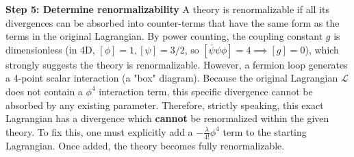 \begin{solution}
\textbf{Step 5: Determine renormalizability}
A theory is renormalizable if all its divergences can be absorbed into counter-terms that have the same form as the terms in the original Lagrangian.
By power counting, the coupling constant $g$ is dimensionless (in 4D, $[\phi]=1, [\psi]=3/2$, so $[\bar{\psi}\psi\phi] = 4 \implies [g]=0$), which strongly suggests the theory is renormalizable.
However, a fermion loop generates a 4-point scalar interaction (a "box" diagram).
Because the original Lagrangian $\mathcal{L}$ does not contain a $\phi^4$ interaction term, this specific divergence cannot be absorbed by any existing parameter. Therefore, strictly speaking, this exact Lagrangian has a divergence which \textbf{cannot} be renormalized within the given theory. To fix this, one must explicitly add a $-\frac{\lambda}{4!}\phi^4$ term to the starting Lagrangian. Once added, the theory becomes fully renormalizable.
\end{solution}
